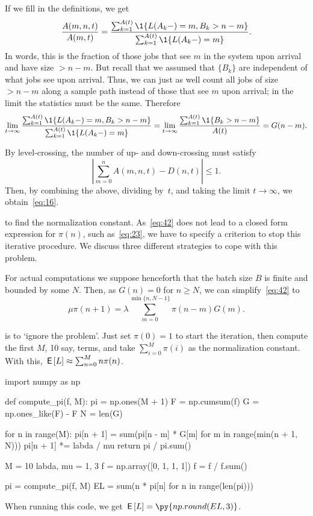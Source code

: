 If we fill in the definitions, we get
\begin{equation*}
 \frac{A(m,n,t)}{A(m,t)} =  \frac{\sum_{k=1}^{A(t)}\1{\L(A_k-) = m, B_k > n-m}}
{\sum_{k=1}^{A(t)}\1{\L(A_k-) = m}}.
\end{equation*}
In words, this is the fraction of those jobs that see $m$ in the system upon arrival and have size $> n-m$.
But recall that we assumed that  $\{B_k\}$  are independent of what jobs see upon arrival.
Thus, we can just as well count all jobs of size $>n-m$ along a sample path instead of those that see $m$ upon arrival; in the limit the statistics must be the same. Therefore
\begin{equation*}
\lim_{t\to\infty}  \frac{\sum_{k=1}^{A(t)}\1{\L(A_k-) = m, B_k > n-m}}
{\sum_{k=1}^{A(t)}\1{\L(A_k-) = m}} = \lim_{t\to\infty}
\frac{\sum_{k=1}^{A(t)}\1{B_k > n-m}}{A(t)}= G(n-m).
\end{equation*}


By level-crossing, the number of up- and down-crossing  must satisfy
\begin{equation*}
\left|\sum_{m=0}^n A(m,n,t) -  D(n,t)\right| \leq 1.
\end{equation*}
Then, by combining the above, dividing by~$t$, and taking the limit $t\to\infty$, we obtain~\cref{eq:16}.


 to find the normalization constant.
As~\cref{eq:42} does not lead to a closed form expression for $\pi(n)$, such as~\cref{eq:23}, we have to specify a criterion to stop this iterative procedure.
We discuss three different strategies to cope with this problem.

For actual computations we suppose henceforth that the batch size $B$ is finite and bounded by some $N$.
Then, as $G(n)=0$ for $n\geq N$, we can simplify~\cref{eq:42} to
\begin{equation*}
\mu \pi(n+1) = \lambda \sum_{m=0}^{\min\{n, N-1\}} \pi(n-m) G(m).
\end{equation*}



 is to `ignore the problem'.
Just set $\pi(0)=1$ to start the iteration, then compute the first $M$, 10 say, terms, and take $\sum_{i=0}^M \pi(i)$ as the normalization constant.
With this, $\,\mathsf{E}\left[L\right] \approx \sum_{n=0}^M n \pi(n)$.

\begin{pyblock}[][numbers=left,frame=lines]
import numpy as np


def compute_pi(f, M):
    pi = np.ones(M + 1)
    F = np.cumsum(f)
    G = np.ones_like(F) - F
    N = len(G)

    for n in range(M):
        pi[n + 1] = sum(pi[n - m] * G[m] for m in range(min(n + 1, N)))
        pi[n + 1] *= labda / mu
    return pi / pi.sum()

M = 10
labda, mu = 1, 3
f = np.array([0, 1, 1, 1])
f = f / f.sum()

pi = compute_pi(f, M)
EL = sum(n * pi[n] for n in range(len(pi)))
\end{pyblock}
When running this code, we get $\E\L = \py{np.round(EL,3)}$.

